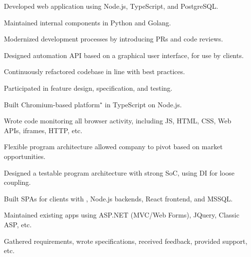 \documentclass[a4paper,11pt]{article}
\begin{document}
\begin{sectionList}
    \begin{jobAppdome}
        \item Developed web application using Node.js, TypeScript, and PostgreSQL.\@
        \item Maintained internal components in Python and Golang.
        \item Modernized development processes by introducing PRs and code reviews.
        \item Designed automation API based on a graphical user interface, for use by clients.
        \item Continuously refactored codebase in line with best practices.
        \item Participated in feature design, specification, and testing.
    \end{jobAppdome}

    \begin{jobReflectizDev}
        \item Built Chromium-based platform$^\star$ in TypeScript on Node.js.
        \item Wrote code monitoring all browser activity, including JS, HTML, CSS, Web APIs, iframes, HTTP, etc.
        \item Flexible program architecture allowed company to pivot based on market opportunities.
        \item Designed a testable program architecture with strong SoC, using DI for loose coupling.
    \end{jobReflectizDev}
    \begin{jobEternitech}
        \item Built SPAs for clients with , Node.js backends, React frontend, and MSSQL.\@
        \item Maintained existing apps using ASP.NET (MVC/Web Forms), JQuery, Classic ASP, etc.
        \item Gathered requirements, wrote specifications, received feedback, provided support, etc.
    \end{jobEternitech}
\end{sectionList}%


\end{document}

